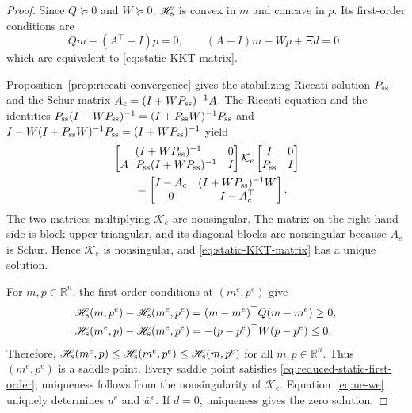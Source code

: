 \documentclass[10pt,journal,twoside]{IEEEtran}
\theoremstyle{definition}
\theoremstyle{remark}
\begin{document}
\begin{proof}
Since \(Q\succeq0\) and \(W\succeq0\),
	\(\mathscr H_{\rm s}\) is convex in \(m\) and concave in \(p\). Its
	first-order conditions are
	\begin{equation}
		Qm+(A^\top-I)p=0,
		\qquad
		(A-I)m-Wp+\Xi d=0,
		\label{eq:reduced-static-first-order}
	\end{equation}
	which are equivalent to \eqref{eq:static-KKT-matrix}.
	
	Proposition~\ref{prop:riccati-convergence} gives the stabilizing Riccati
	solution \(P_{\rm ss}\) and the Schur matrix
	\(A_c=(I+WP_{\rm ss})^{-1}A\). The Riccati equation and the identities
	\(
	P_{\rm ss}(I+WP_{\rm ss})^{-1}
	=(I+P_{\rm ss}W)^{-1}P_{\rm ss}
	\)
	and
	\(
	I-W(I+P_{\rm ss}W)^{-1}P_{\rm ss}
	=(I+WP_{\rm ss})^{-1}
	\)
	yield
	\begin{equation*}
		\begin{aligned}
			&
			\begin{bmatrix}
				(I+WP_{\rm ss})^{-1}&0\\
				A^\top P_{\rm ss}(I+WP_{\rm ss})^{-1}&I
			\end{bmatrix}
			\mathcal K_e
			\begin{bmatrix}
				I&0\\
				P_{\rm ss}&I
			\end{bmatrix}\\
			&\qquad=
			\begin{bmatrix}
				I-A_c&(I+WP_{\rm ss})^{-1}W\\
				0&I-A_c^\top
			\end{bmatrix}.
		\end{aligned}
	\end{equation*}
	The two matrices multiplying \(\mathcal K_e\) are nonsingular. The matrix on
	the right-hand side is block upper triangular, and its diagonal blocks are
	nonsingular because \(A_c\) is Schur. Hence \(\mathcal K_e\) is nonsingular,
	and \eqref{eq:static-KKT-matrix} has a unique solution.
	
For \(m,p\in\mathbb R^n\), the first-order conditions at
	\((m^e,p^e)\) give
	\begin{align*}
		&\mathscr H_{\rm s}(m,p^e)-\mathscr H_{\rm s}(m^e,p^e)=(m-m^e)^\top Q(m-m^e)\ge0,\\
		&\mathscr H_{\rm s}(m^e,p)-\mathscr H_{\rm s}(m^e,p^e)=-(p-p^e)^\top W(p-p^e)\le0.
		\label{eq:static-saddle-max}
	\end{align*}
	Therefore, $\mathscr H_{\rm s}(m^e,p)
			\le \mathscr H_{\rm s}(m^e,p^e)\le \mathscr H_{\rm s}(m,p^e)$ for all
			$m,p\in\mathbb R^n$.
	Thus \((m^e,p^e)\) is a saddle point. Every saddle point satisfies
	\eqref{eq:reduced-static-first-order}; uniqueness follows from the
	nonsingularity of \(\mathcal K_e\). Equation~\eqref{eq:ue-we} uniquely
	determines \(u^e\) and \(\bar w^e\). If \(d=0\), uniqueness gives the zero
	solution.
\end{proof}
\end{document}
